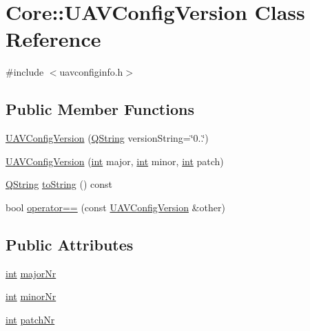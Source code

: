 \hypertarget{class_core_1_1_u_a_v_config_version}{\section{Core\-:\-:U\-A\-V\-Config\-Version Class Reference}
\label{class_core_1_1_u_a_v_config_version}
}


{\ttfamily \#include $<$uavconfiginfo.\-h$>$}

\subsection*{Public Member Functions}
\begin{DoxyCompactItemize}
\item 
\hyperlink{group___core_plugin_gaa5e966ca40b0d2dc27736118c62e3b9a}{U\-A\-V\-Config\-Version} (\hyperlink{group___u_a_v_objects_plugin_gab9d252f49c333c94a72f97ce3105a32d}{Q\-String} version\-String=\char`\"{}0..\char`\"{})
\item 
\hyperlink{group___core_plugin_gae062fee28dd1581628f466c695ada76b}{U\-A\-V\-Config\-Version} (\hyperlink{ioapi_8h_a787fa3cf048117ba7123753c1e74fcd6}{int} major, \hyperlink{ioapi_8h_a787fa3cf048117ba7123753c1e74fcd6}{int} minor, \hyperlink{ioapi_8h_a787fa3cf048117ba7123753c1e74fcd6}{int} patch)
\item 
\hyperlink{group___u_a_v_objects_plugin_gab9d252f49c333c94a72f97ce3105a32d}{Q\-String} \hyperlink{group___core_plugin_ga2e4d1cb09f2247d7add5cdc77ae8871e}{to\-String} () const 
\item 
bool \hyperlink{group___core_plugin_ga790d498b6af141ce950dc95b6f53d53b}{operator==} (const \hyperlink{class_core_1_1_u_a_v_config_version}{U\-A\-V\-Config\-Version} \&other)
\end{DoxyCompactItemize}
\subsection*{Public Attributes}
\begin{DoxyCompactItemize}
\item 
\hyperlink{ioapi_8h_a787fa3cf048117ba7123753c1e74fcd6}{int} \hyperlink{group___core_plugin_gac05539a177a40beac60eda4492f9e8cd}{major\-Nr}
\item 
\hyperlink{ioapi_8h_a787fa3cf048117ba7123753c1e74fcd6}{int} \hyperlink{group___core_plugin_gad622c08143c80bf70a137d813062c911}{minor\-Nr}
\item 
\hyperlink{ioapi_8h_a787fa3cf048117ba7123753c1e74fcd6}{int} \hyperlink{group___core_plugin_ga990f8dc285c5d4e049ac773ba645d8f2}{patch\-Nr}
\end{DoxyCompactItemize}


